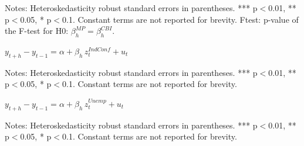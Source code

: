 \documentclass[a4paper,12pt]{article}
\newcommand{\pathTables}{../workm_lp/}
\begin{document}
\begin{table}[!htbp]\addtocounter{table}{-1}\small
\begin{center}
\caption{Continued}
\end{center}
Notes: Heteroskedasticity robust standard errors in parentheses. *** p$<$0.01, ** p$<$0.05, * p$<$0.1.
Constant terms are not reported for brevity.
Ftest: p-value of the F-test for H0: $\beta^{MP}_h=\beta^{CBI}_h$.
\end{table}


\begin{table}[!htbp]
\begin{center}
\caption{The effect of European industrial confidence surprises on stock sub-indices}\label{tab: lp z ea bcs confind stocks}
$y^{}_{t+h}-y^{}_{t-1} = \alpha + \beta_h\, z^{IndConf}_t + u_t$
\small
{}
\end{center}\footnotesize
Notes: Heteroskedasticity robust standard errors in parentheses. *** p$<$0.01, ** p$<$0.05, * p$<$0.1.
Constant terms are not reported for brevity.
\end{table}

\begin{table}[!htbp]
\begin{center}
\caption{The effect of euro area unemployment rate surprises on stock sub-indices}\label{tab: lp z ea unemp stocks}
$y^{}_{t+h}-y^{}_{t-1} = \alpha + \beta_h\, z^{Unemp}_t + u_t$
\small
{}
\end{center}\footnotesize
Notes: Heteroskedasticity robust standard errors in parentheses. *** p$<$0.01, ** p$<$0.05, * p$<$0.1.
Constant terms are not reported for brevity.
\end{table}
\end{document}
